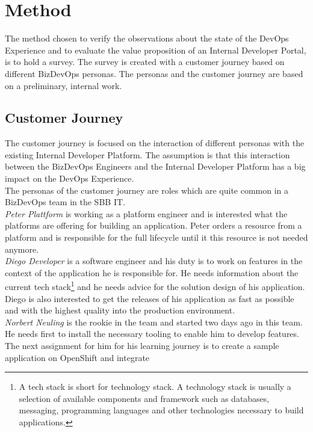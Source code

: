 \documentclass[a4paper,10pt]{article}
\begin{document}
    \section{Method}
    \label{sec:method}
    The method chosen to verify the observations about the state of the DevOps Experience and to evaluate the value proposition
    of an Internal Developer Portal, is to hold a survey.
    The survey is created with a customer journey based on different BizDevOps personas.
    The personas and the customer journey are based on a preliminary, internal work\parencite{sbbjobstobedone}.

    \subsection{Customer Journey}
    \label{subsec:cusjour}
    The customer journey is focused on the interaction of different personas with the existing Internal Developer Platform.
    The assumption is that this interaction between the BizDevOps Engineers and the Internal Developer Platform has a big
    impact on the DevOps Experience.\\
    The personas of the customer journey are roles which are quite common in a BizDevOps team in the SBB IT.\\
    \textit{Peter Plattform} is working as a platform engineer and is interested what the platforms are offering for building
    an application.
    Peter orders a resource from a platform and is responsible for the full lifecycle until it this resource is not
    needed anymore.\\
    \textit{Diego Developer} is a software engineer and his duty is to work on features in the context of the application
    he is responsible for.
    He needs information about the current tech stack\footnote{A tech stack is short for technology stack.
    A technology stack is usually a selection of available components and framework such as databases, messaging, programming
    languages and other technologies necessary to build applications.} and he needs advice for the solution design of his application.
    Diego is also interested to get the releases of his application as fast as possible and with the highest quality
    into the production environment.\\
    \textit{Norbert Neuling} is the rookie in the team and started two days ago in this team.
    He needs first to install the necessary tooling to enable him to develop features.
    The next assignment for him for his learning journey is to create a sample application on OpenShift and integrate
\end{document}
